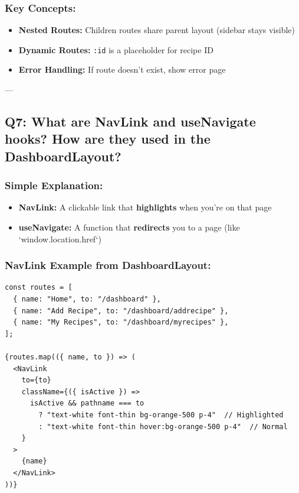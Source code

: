 \documentclass[12pt]{article}
\begin{document}
\subsubsection*{Key Concepts:}

\begin{itemize}
    \item \textbf{Nested Routes:} Children routes share parent layout (sidebar stays visible)
    \item \textbf{Dynamic Routes:} \texttt{:id} is a placeholder for recipe ID
    \item \textbf{Error Handling:} If route doesn't exist, show error page
\end{itemize}

---

\subsection{Q7: What are NavLink and useNavigate hooks? How are they used in the DashboardLayout?}

\subsubsection*{Simple Explanation:}

\begin{itemize}
    \item \textbf{NavLink:} A clickable link that \textbf{highlights} when you're on that page
    \item \textbf{useNavigate:} A function that \textbf{redirects} you to a page (like `window.location.href`)
\end{itemize}

\subsubsection*{NavLink Example from DashboardLayout:}

\begin{lstlisting}
const routes = [
  { name: "Home", to: "/dashboard" },
  { name: "Add Recipe", to: "/dashboard/addrecipe" },
  { name: "My Recipes", to: "/dashboard/myrecipes" },
];

{routes.map(({ name, to }) => (
  <NavLink
    to={to}
    className={({ isActive }) =>
      isActive && pathname === to
        ? "text-white font-thin bg-orange-500 p-4"  // Highlighted
        : "text-white font-thin hover:bg-orange-500 p-4"  // Normal
    }
  >
    {name}
  </NavLink>
))}
\end{lstlisting}
\end{document}
